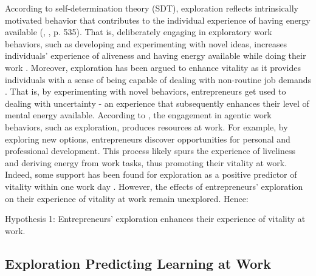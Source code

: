 \documentclass[man, 12pt, a4paper, noextraspace]{apa6}
\begin{document}
According to self-determination theory (SDT), exploration reflects intrinsically motivated behavior that contributes to the individual experience of having energy available (\citeauthor{Ryan.1997}, \citeyear{Ryan.1997}, p. 535). 
That is, deliberately engaging in exploratory work behaviors, such as developing and experimenting with novel ideas, increases individuals' experience of aliveness and having energy available while doing their work \parencite{Spreitzer.2005b}. 
Moreover, exploration has been argued to enhance vitality as it provides individuals with a sense of being capable of dealing with non-routine job demands \parencite{Daniels2009, Niessen.2012}.
That is, by experimenting with novel behaviors, entrepreneurs get used to dealing with uncertainty - an experience that subsequently enhances their level of mental energy available. 
According to \textcite{Spreitzer.2005b}, the engagement in agentic work behaviors, such as exploration, produces resources at work. 
For example, by exploring new options, entrepreneurs discover opportunities for personal and professional development. 
This process likely spurs the experience of liveliness and deriving energy from work tasks, thus promoting their vitality at work. 
Indeed, some support has been found for exploration as a positive predictor of vitality within one work day \textcite{Niessen.2012}.
However, the effects of entrepreneurs' exploration on their experience of vitality at work remain unexplored. 
Hence: \par 

Hypothesis 1: Entrepreneurs' exploration enhances their experience of vitality at work. \par 

\subsection{Exploration Predicting Learning at Work}
\end{document}
